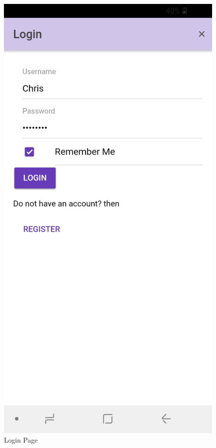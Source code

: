 \documentclass[12pt]{article}
\begin{document}
\begin{figure}[H]
\endminipage\hfill
{}
  \includegraphics[width=\linewidth]{figures/Login.jpg}
  \caption{Login Page}\label{fig:awesome_image5}
\endminipage\hfill
{}%

\end{figure}
\end{document}
